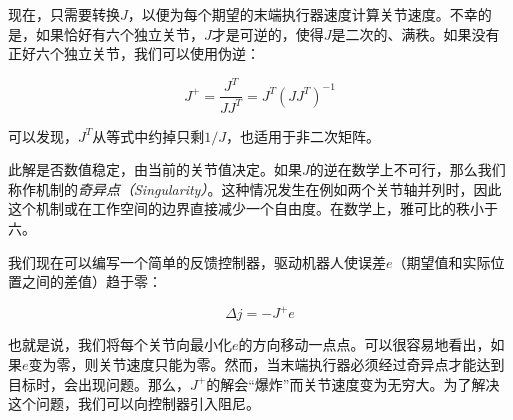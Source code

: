 现在，只需要转换$J$，以便为每个期望的末端执行器速度计算关节速度。不幸的是，如果恰好有六个独立关节，$J$才是可逆的，使得$J$是二次的、满秩。如果没有正好六个独立关节，我们可以使用伪逆：

\begin{equation}
J^+=\frac{J^T}{JJ^T}=J^T(JJ^T)^{-1}
\end{equation}


可以发现，$J^T$从等式中约掉只剩$1/J$，也适用于非二次矩阵。


此解是否数值稳定，由当前的关节值决定。如果$J$的逆在数学上不可行，那么我们称作机制的\emph{奇异点（Singularity）}。这种情况发生在例如两个关节轴并列时，因此这个机制或在工作空间的边界直接减少一个自由度。在数学上，雅可比的秩小于六。


我们现在可以编写一个简单的反馈控制器，驱动机器人使误差$e$（期望值和实际位置之间的差值）趋于零：

\begin{equation}
\Delta{j}=-J^+e
\end{equation}



也就是说，我们将每个关节向最小化$e$的方向移动一点点。可以很容易地看出，如果$e$变为零，则关节速度只能为零。然而，当末端执行器必须经过奇异点才能达到目标时，会出现问题。那么，$J^+$的解会“爆炸”而关节速度变为无穷大。为了解决这个问题，我们可以向控制器引入阻尼。

